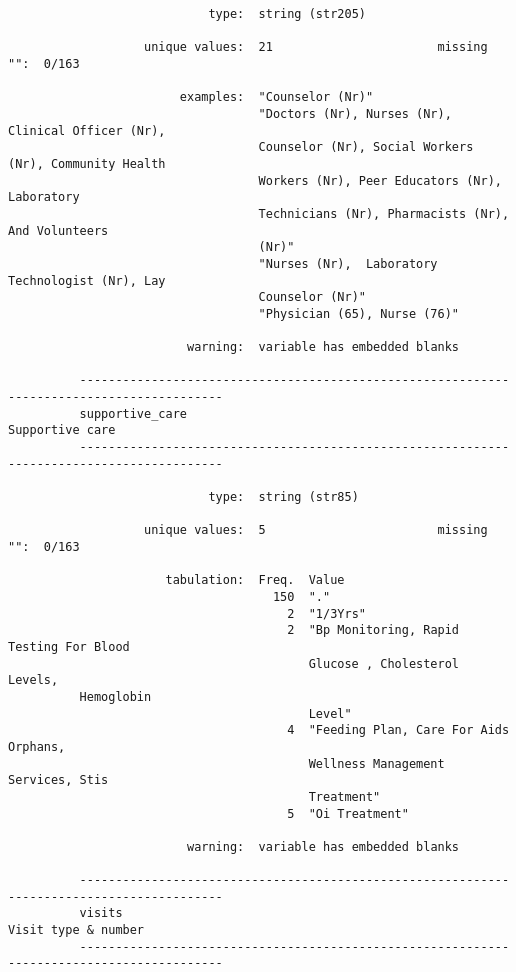 \documentclass{article}
\begin{document}
\begin{verbatim}
                            type:  string (str205)
          
                   unique values:  21                       missing "":  0/163
          
                        examples:  "Counselor (Nr)"
                                   "Doctors (Nr), Nurses (Nr), Clinical Officer (Nr),
                                   Counselor (Nr), Social Workers (Nr), Community Health
                                   Workers (Nr), Peer Educators (Nr), Laboratory
                                   Technicians (Nr), Pharmacists (Nr), And Volunteers
                                   (Nr)"
                                   "Nurses (Nr),  Laboratory Technologist (Nr), Lay
                                   Counselor (Nr)"
                                   "Physician (65), Nurse (76)"
          
                         warning:  variable has embedded blanks
          
          ------------------------------------------------------------------------------------------
          supportive_care                                                            Supportive care
          ------------------------------------------------------------------------------------------
          
                            type:  string (str85)
          
                   unique values:  5                        missing "":  0/163
          
                      tabulation:  Freq.  Value
                                     150  "."
                                       2  "1/3Yrs"
                                       2  "Bp Monitoring, Rapid Testing For Blood
                                          Glucose , Cholesterol Levels,
          Hemoglobin
                                          Level"
                                       4  "Feeding Plan, Care For Aids Orphans,
                                          Wellness Management Services, Stis
                                          Treatment"
                                       5  "Oi Treatment"
          
                         warning:  variable has embedded blanks
          
          ------------------------------------------------------------------------------------------
          visits                                                                 Visit type & number
          ------------------------------------------------------------------------------------------
          

\end{verbatim}
\end{document}
